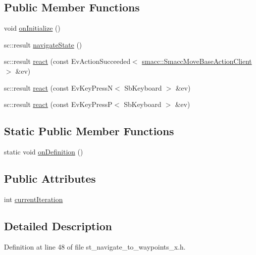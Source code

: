 \subsection*{Public Member Functions}
\begin{DoxyCompactItemize}
\item 
void \hyperlink{structStNavigateToWaypointsX_ac5f251c0431495e14c458a298592b663}{on\+Initialize} ()
\item 
sc\+::result \hyperlink{structStNavigateToWaypointsX_a0df2892ed95cae253b2ae0c09c850268}{navigate\+State} ()
\item 
sc\+::result \hyperlink{structStNavigateToWaypointsX_a9d8d8e362b587429680ea2800a6c181c}{react} (const Ev\+Action\+Succeeded$<$ \hyperlink{classsmacc_1_1SmaccMoveBaseActionClient}{smacc\+::\+Smacc\+Move\+Base\+Action\+Client} $>$ \&ev)
\item 
sc\+::result \hyperlink{structStNavigateToWaypointsX_ab9973901dfb0db2035223ec81d6fe0df}{react} (const Ev\+Key\+PressN$<$ Sb\+Keyboard $>$ \&ev)
\item 
sc\+::result \hyperlink{structStNavigateToWaypointsX_aa2d1a8c49b4c3227201eb300e21e53c1}{react} (const Ev\+Key\+PressP$<$ Sb\+Keyboard $>$ \&ev)
\end{DoxyCompactItemize}
\subsection*{Static Public Member Functions}
\begin{DoxyCompactItemize}
\item 
static void \hyperlink{structStNavigateToWaypointsX_a0698c15b3241c4aa15a4f5380365e72d}{on\+Definition} ()
\end{DoxyCompactItemize}
\subsection*{Public Attributes}
\begin{DoxyCompactItemize}
\item 
int \hyperlink{structStNavigateToWaypointsX_a2f597fd0ee0258ef66506e98d55e8060}{current\+Iteration}
\end{DoxyCompactItemize}


\subsection{Detailed Description}


Definition at line 48 of file st\+\_\+navigate\+\_\+to\+\_\+waypoints\+\_\+x.\+h.



